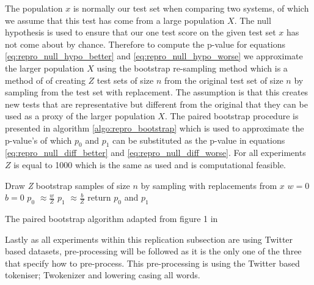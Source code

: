 The population $x$ is normally our test set when comparing two systems, of which we assume that this test has come from a large population $X$. The null hypothesis is used to ensure that our one test score on the given test set $x$ has not come about by chance. Therefore to compute the p-value for equations \ref{eq:repro_null_hypo_better} and \ref{eq:repro_null_hypo_worse} we approximate the larger population $X$ using the bootstrap re-sampling method which is a method of of creating $Z$ test sets of size $n$ from the original test set of size $n$ by sampling from the test set with replacement. The assumption is that this creates new tests that are representative but different from the original that they can be used as a proxy of the larger population $X$. The paired bootstrap procedure is presented in algorithm \ref{algo:repro_bootstrap} which is used to approximate the p-value's of which $p_0$ and $p_1$ can be substituted as the p-value in equations \ref{eq:repro_null_diff_better} and \ref{eq:repro_null_diff_worse}. For all experiments $Z$ is equal to 1000 which is the same as \citet{koehn-2004-statistical} used and is computational feasible. 

\begin{algorithm}
    Draw \textit{Z} bootstrap samples of size $n$ by sampling with replacements from $x$\;
    $w = 0$\;
    $b = 0$\;
    $p_0$ $\approx \frac{w}{Z}$\;
    $p_1$ $\approx \frac{b}{Z}$\;
    return $p_0$ and $p_1$\;
    \caption{The paired bootstrap algorithm adapted from figure 1 in \citet{berg-kirkpatrick-etal-2012-empirical}}
    \label{algo:repro_bootstrap}
\end{algorithm}
Lastly as all experiments within this replication subsection are using Twitter based datasets, \citet{vo2015target} pre-processing will be followed as it is the only one of the three that specify how to pre-process. This pre-processing is using the Twitter based tokeniser; Twokenizer \citep{gimpel-etal-2011-part} and lowering casing all words.

